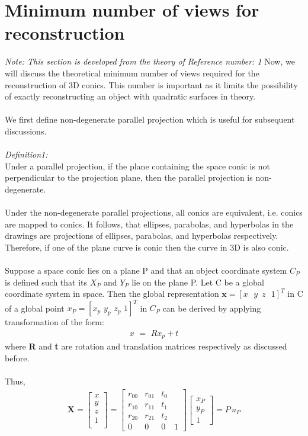 \documentclass[
11pt, %
english, %
singlespacing, %
headsepline, %
]{MastersDoctoralThesis} %
\begin{document}
\section{Minimum number of views for reconstruction}
\emph{Note: This section is developed from the theory of Reference number: 1}
Now, we will discuss the theoretical minimum number of views required for the reconstruction of 3D conics. This number is important as it limits the possibility of exactly reconstructing an object with quadratic surfaces in theory.\\ \\
We first define non-degenerate parallel projection which is useful for subsequent discussions. \\ \\
\emph{Definition1: }\\
Under a parallel projection, if the plane containing the space conic is not perpendicular to the projection plane, then the parallel projection is non-degenerate.  \\ \\
Under the non-degenerate parallel projections, all conics are equivalent, i.e. conics are mapped to conics. It follows, that ellipses, parabolas, and hyperbolas in the drawings are projections of ellipses, parabolas, and hyperbolas respectively. Therefore, if one of the plane curve is conic then the curve in 3D is also conic. \\ \\
Suppose a space conic lies on a plane P and that an object coordinate system $C_P$ is defined such that its $X_P$ and $Y_P$ lie on the plane P. Let C be a global coordinate system in space. Then the global representation $\textbf{x} = [x\,\,\,\,y\,\,\, z\,\,\,\,1]^T$ in C of a global point $\textbf{$x_P$} = [x_p\,\,y_p\,\,z_p\,\,1]^T$ in $C_P$ can be derived by applying transformation of the form:
\begin{align*} \textbf{$x\,\,=\,\,Rx_p + t$} \tag{2.5.1} \end{align*}
where \textbf{R} and \textbf{t} are rotation and translation matrices respectively as discussed before.\\ \\
Thus,\\
\begin{align*} \textbf{X} = 
\begin{bmatrix}
x \\ y \\ z \\ 1 \\ 
\end{bmatrix}
 = 
\begin{bmatrix}
r_{00} & r_{01} & t_0 \\
r_{10} & r_{11} & t_1 \\
r_{20} & r_{21} & t_2 \\
0 & 0 & 0 & 1
\end{bmatrix}
\begin{bmatrix}
x_P \\ y_P \\ 1
\end{bmatrix}
= \textbf{$P \, u_P$}
\tag{2.5.2} \end{align*} 
\end{document}
